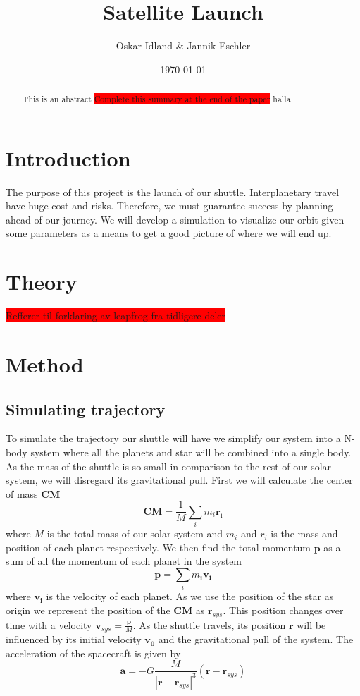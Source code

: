 \documentclass[reprint,english,notitlepage]{revtex4-2}
\begin{document}
\title{Satellite Launch}
\author{Oskar Idland \& Jannik Eschler}
\date{\today}

\begin{abstract}
    This is an abstract \colorbox{red}{Complete this summary at the end of the paper} halla 
\end{abstract}
\maketitle

\section{Introduction} \label{sec:introduction}
The purpose of this project is the launch of our shuttle.
Interplanetary travel have huge cost and risks.
Therefore, we must guarantee success by planning ahead of our journey.
We will develop a simulation to visualize our orbit given some parameters as a means to get a good picture of where we will end up.

\section{Theory} \label{sec: theory}
\colorbox{red}{Refferer til forklaring av leapfrog fra tidligere deler}

\section{Method} \label{sec: method}
\subsection{Simulating trajectory} \label{ssec: simulating trajectory}
To simulate the trajectory our shuttle will have we simplify our system into a N-body system where all the planets and star will be combined into a single body.
As the mass of the shuttle is so small in comparison to the rest of our solar system, we will disregard its gravitational pull.
First we will calculate the center of mass $ \mathbf{CM} $
\[
\mathbf{CM} = \frac{1}{M} \sum_{i} m_i \mathbf{r_i}
\]
where $ M $ is the total mass of our solar system and $ m_i $ and $ r_i $ is the mass and position of each planet respectively.
We then find the total momentum $ \mathbf{p} $ as a sum of all the momentum of each planet in the system
\[
\mathbf{p} = \sum_{i} m_i \mathbf{v_i}
\]
where $ \mathbf{v_i} $ is the velocity of each planet. 
As we use the position of the star as origin we represent the position of the $ \mathbf{CM} $ as $ \mathbf{r}_{sys} $.
This position changes over time with a velocity $ \mathbf{v}_{sys} = \frac{\mathbf{p}}{M} $.
As the shuttle travels, its position $ \mathbf{r} $ will be influenced by its initial velocity $ \mathbf{v_0} $ and the gravitational pull of the system.
The acceleration of the spacecraft is given by
\[
\mathbf{a} = -G \frac{M}{\left\vert \mathbf{r} - \mathbf{r}_{sys} \right\vert ^{3}} \left( \mathbf{r} - \mathbf{r}_{sys} \right)
\]
\end{document}
